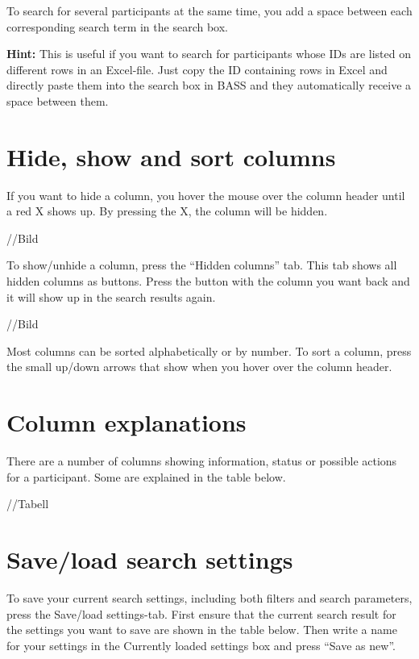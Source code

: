 \documentclass[]{book}
\begin{document}
To search for several participants at the same time, you add a space between each corresponding search term in the search box.

\textbf{Hint:} This is useful if you want to search for participants whose IDs are listed on different rows in an Excel-file. Just copy the ID containing rows in Excel and directly paste them into the search box in BASS and they automatically receive a space between them.

\hypertarget{hide-show-and-sort-columns}{%
\section{Hide, show and sort columns}\label{hide-show-and-sort-columns}}

If you want to hide a column, you hover the mouse over the column header until a red X shows up. By pressing the X, the column will be hidden.

//Bild

To show/unhide a column, press the ``Hidden columns'' tab. This tab shows all hidden columns as buttons. Press the button with the column you want back and it will show up in the search results again.

//Bild

Most columns can be sorted alphabetically or by number. To sort a column, press the small up/down arrows that show when you hover over the column header.

\hypertarget{column-explanations}{%
\section{Column explanations}\label{column-explanations}}

There are a number of columns showing information, status or possible actions for a participant. Some are explained in the table below.

//Tabell

\hypertarget{saveload-search-settings}{%
\section{Save/load search settings}\label{saveload-search-settings}}

To save your current search settings, including both filters and search parameters, press the Save/load settings-tab. First ensure that the current search result for the settings you want to save are shown in the table below. Then write a name for your settings in the Currently loaded settings box and press ``Save as new''.
\end{document}
